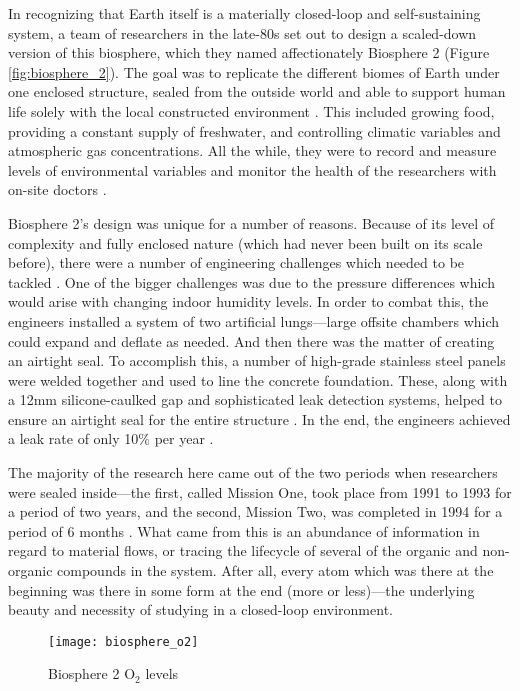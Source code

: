 In recognizing that Earth itself is a materially closed-loop and self-sustaining system, a team of researchers in the late-80s set out to design a scaled-down version of this biosphere, which they named affectionately Biosphere 2 (Figure \ref{fig:biosphere_2}). The goal was to replicate the different biomes of Earth under one enclosed structure, sealed from the outside world and able to support human life solely with the local constructed environment \cite{biosphere_intro}. This included growing food, providing a constant supply of freshwater, and controlling climatic variables and atmospheric gas concentrations. All the while, they were to record and measure levels of environmental variables and monitor the health of the researchers with on-site doctors \cite{dempster_conf}.

Biosphere 2’s design was unique for a number of reasons. Because of its level of complexity and fully enclosed nature (which had never been built on its scale before), there were a number of engineering challenges which needed to be tackled \cite{biosphere_intro}. One of the bigger challenges was due to the pressure differences which would arise with changing indoor humidity levels. In order to combat this, the engineers installed a system of two artificial lungs—large offsite chambers which could expand and deflate as needed. And then there was the matter of creating an airtight seal. To accomplish this, a number of high-grade stainless steel panels were welded together and used to line the concrete foundation. These, along with a 12mm silicone-caulked gap and sophisticated leak detection systems, helped to ensure an airtight seal for the entire structure \cite{biosphere_closed_loop}. In the end, the engineers achieved a leak rate of only 10\% per year \cite{biosphere_leakage}.

The majority of the research here came out of the two periods when researchers were sealed inside—the first, called Mission One, took place from 1991 to 1993 for a period of two years, and the second, Mission Two, was completed in 1994 for a period of 6 months \cite{biosphere_mission_one}. What came from this is an abundance of information in regard to material flows, or tracing the lifecycle of several of the organic and non-organic compounds in the system. After all, every atom which was there at the beginning was there in some form at the end (more or less)—the underlying beauty and necessity of studying in a closed-loop environment.

\begin{wrapfigure}{l}{0.6\textwidth}
    \centering
    \texttt{[image: biosphere\_o2]}
    \caption{Biosphere 2 O$_2$ levels}
    \label{fig:biosphere_o2}
\end{wrapfigure}

